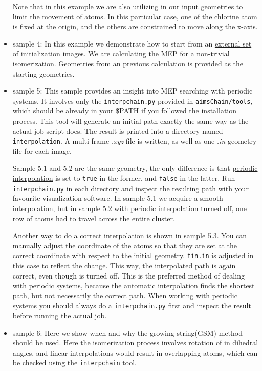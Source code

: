 \begin{itemize}
 Note that in this example we are also utilizing  in our input geometries to limit the movement of atoms. In this particular case, one of the chlorine atom is fixed at the origin, and the others are constrained to move along the x-axis. 
 \item sample 4: In this example we demonstrate how to start from an \hyperlink{aimsChainexternal\_geometry}{external set of initialization images}. We are calculating the MEP for a non-trivial isomerization. Geometries from an previous calculation is provided as the starting geometries. 
 \item sample 5: This sample provides an insight into MEP searching with periodic systems. It involves only the \texttt{interpchain.py} provided in \texttt{aimsChain/tools}, which should be already in your \$PATH if you followed the installation process. This tool will generate an initial path exactly the same way as the actual job script does. The result is printed into a directory named
 \texttt{interpolation}. A multi-frame \textit{.xyz} file is written, as well as one \textit{.in} geometry file for each image. 

Sample 5.1 and 5.2 are the same geometry, the only difference is that \hyperlink{aimsChainperiodic\_interpolation}{periodic interpolation} is set to \texttt{true} in the former, and \texttt{false} in the latter. Run \texttt{interpchain.py} in each directory and inspect the resulting path with your favourite visualization software. In sample 5.1 we acquire a smooth interpolation, but in sample 5.2 with periodic interpolation turned off, one row of atoms had to travel across the entire cluster. 

Another way to do a correct interpolation is shown in sample 5.3. You can manually adjust the coordinate of the atoms so that they are set at the correct coordinate with respect to the initial geometry. \texttt{fin.in} is adjusted in this case to reflect the change. This way, the interpolated path is again correct, even though  is turned off. This is the preferred method of dealing with periodic systems, because the automatic interpolation finds the shortest path, but not necessarily the correct path. When working with periodic systems you should always do a \texttt{interpchain.py} first and inspect the result before running the actual job. 
\item sample 6: Here we show when and why the growing string(GSM) method should be used. Here the isomerization process involves rotation of in dihedral angles, and linear interpolations would result in overlapping atoms, which can be checked using the \texttt{interpchain} tool. 


\end{itemize}

